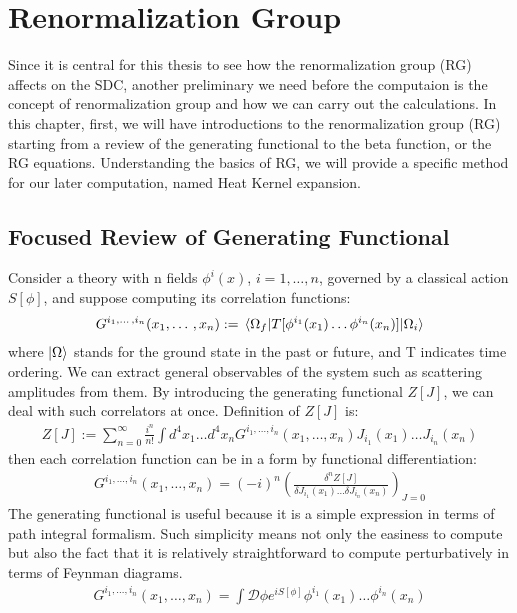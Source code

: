 \chapter{Renormalization Group}
\label{RG}
Since it is central for this thesis to see how the renormalization group (RG) affects on the SDC, another preliminary we need before the computaion is the concept of renormalization group and how we can carry out the calculations. In this chapter, first, we will have introductions to the renormalization group (RG) starting from a review of the generating functional to the beta function, or the RG equations. Understanding the basics of RG, we will provide a specific method for our later computation, named Heat Kernel expansion.

\section{Focused Review of Generating Functional}
Consider a theory with n fields $\phi^{i} (x)$, $i = 1, \dotso , n$, governed by a classical action $S[\phi]$, and suppose computing its correlation functions:
\begin{align}
    G^{i_{1}, \dotso , i_{n}} (x_{1}, \dotso ,x_{n} ) := \mel{\Omega _{f}}{T[\phi^{i_{1}}(x_{1}) \dots \phi^{i_{n}} (x_{n})]}{\Omega _{i}}
\end{align}
where $\ket{\Omega}$ stands for the ground state in the past or future, and T indicates time ordering. We can extract general observables of the system such as scattering amplitudes from them. By introducing the generating functional $Z[J]$, we can deal with such correlators at once. Definition of $Z[J]$ is:
\begin{align}
    Z[J] := \sum_{n=0} ^{\infty} \frac{i^{n}}{n!} \int d^{4}x_{1} \dotso d^{4}x_{n}   G^{i_{1}, \dotso , i_{n}} (x_{1}, \dotso ,x_{n} ) J_{i_{1}}(x_{1}) \dots J_{{i_{n}}}(x_{n})
\end{align}
then each correlation function can be in a form by functional differentiation:
\begin{align}
    G^{i_{1}, \dotso , i_{n}} (x_{1}, \dotso ,x_{n} ) = (-i)^{n} (\frac{\delta^{n}Z[J]}{\delta J_{i_{1}}(x_{1}) \dots \delta J_{i_n} (x_{n})}) _{J=0}
\end{align}
The generating functional is useful because it is a simple expression in terms of path integral formalism. Such simplicity means not only the easiness to compute but also the fact that it is relatively straightforward to compute perturbatively in terms of Feynman diagrams. 
\begin{align}
    G^{i_{1}, \dotso , i_{n}} (x_{1}, \dotso ,x_{n} ) = \int \mathcal{D} \phi e^{iS[\phi]} \phi^{i_1} (x_{1}) \dots \phi ^{i_{n}}(x_n)
\end{align}

